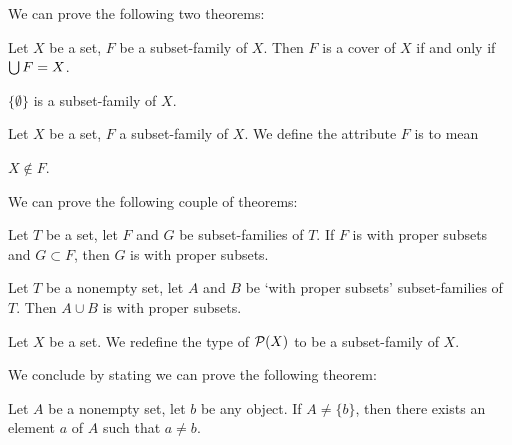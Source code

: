 \documentclass{article}
\begin{document}
We can prove the following two theorems:
\begin{thm}
\item\label{setfam1:45} Let $X$ be a set, $F$ be a subset-family of $X$.
Then $F$ is a cover of $X$ if and only if $\bigcup F=X$.
\item\label{setfam1:46} $\{\emptyset\}$ is a subset-family of $X$.
\end{thm}

\begin{definition}
Let $X$ be a set, $F$ a subset-family of $X$.
We define the attribute $F$ is  to mean
\begin{defn}
\item $X\notin F$.
\end{defn}
\end{definition}

We can prove the following couple of theorems:
\begin{thm}
\item\label{setfam1:47} Let $T$ be a set, let $F$ and $G$ be
  subset-families of $T$. If $F$ is with proper subsets and $G\subset F$,
  then $G$ is with proper subsets.
\item\label{setfam1:48} Let $T$ be a nonempty set, let $A$ and $B$ be
  `with proper subsets' subset-families of $T$. Then $A\cup B$ is with
  proper subsets.
\end{thm}

\begin{definition}
Let $X$ be a set. We redefine the type of $\mathcal{P}(X)$ to be a
subset-family of $X$.
\end{definition}

We conclude by stating we can prove the following theorem:
\begin{thm}
\item\label{setfam1:49} Let $A$ be a nonempty set, let $b$ be any object.
If $A\neq\{b\}$, then there exists an element $a$ of $A$ such that
$a\neq b$.
\end{thm}
\end{document}
